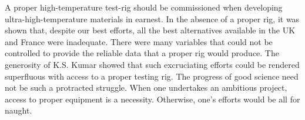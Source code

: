 A proper high-temperature test-rig should be commissioned when developing ultra-high-temperature materials in earnest.  In the absence of a proper rig, it was shown that, despite our best efforts, all the best alternatives available in the UK and France were inadequate.  There were many variables that could not be controlled to provide the reliable data that a proper rig would produce.  The generosity of K.S. Kumar showed that such excruciating efforts could be rendered superfluous with access to a proper testing rig.  The progress of good science need not be such a protracted struggle.  When one undertakes an ambitious project, access to proper equipment is a necessity.  Otherwise, one’s efforts would be all for naught. 